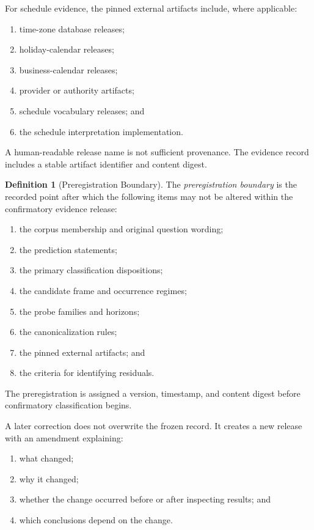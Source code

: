 \documentclass[11pt]{article}
\theoremstyle{plain}
\theoremstyle{definition}
\newtheorem{definition}[theorem]{Definition}
\theoremstyle{remark}
\begin{document}
For schedule evidence, the pinned external artifacts include, where applicable:

\begin{enumerate}[label=(\alph*)]
  \item time-zone database releases;
  \item holiday-calendar releases;
  \item business-calendar releases;
  \item provider or authority artifacts;
  \item schedule vocabulary releases; and
  \item the schedule interpretation implementation.
\end{enumerate}

A human-readable release name
is not sufficient provenance.
The evidence record includes
a stable artifact identifier
and content digest.

\begin{definition}[Preregistration Boundary]
  \label{ik.def.preregistration-boundary}
  The \emph{preregistration boundary}
  is the recorded point
  after which the following items
  may not be altered
  within the confirmatory evidence release:
  \begin{enumerate}[label=(\alph*)]
    \item the corpus membership
          and original question wording;
    \item the prediction statements;
    \item the primary classification dispositions;
    \item the candidate frame
          and occurrence regimes;
    \item the probe families
          and horizons;
    \item the canonicalization rules;
    \item the pinned external artifacts; and
    \item the criteria for identifying residuals.
  \end{enumerate}
\end{definition}

The preregistration is assigned a version, timestamp, and content digest
before confirmatory classification begins.

A later correction does not overwrite
the frozen record.
It creates a new release
with an amendment explaining:

\begin{enumerate}[label=(\alph*)]
  \item what changed;
  \item why it changed;
  \item whether the change occurred
        before or after inspecting results; and
  \item which conclusions depend on the change.
\end{enumerate}
\end{document}
